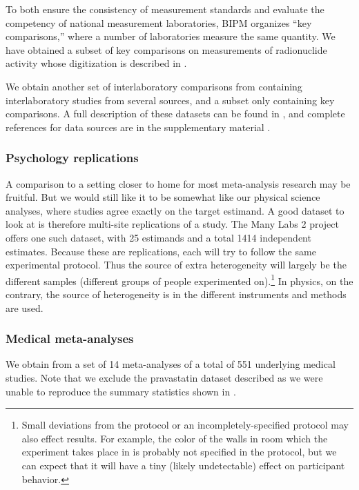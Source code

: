 \documentclass[letterpaper,12pt]{article}
\begin{document}
To both ensure the consistency of measurement standards and evaluate the competency of national measurement laboratories, BIPM organizes ``key comparisons,'' where a number of laboratories measure the same quantity. We have obtained a subset of key comparisons on measurements of radionuclide activity whose digitization is described in \cite{coulon2021digitalization}.

We obtain another set of interlaboratory comparisons from \citet{bailey2017not} containing interlaboratory studies from several sources, and a subset only containing key comparisons. A full description of these datasets can be found in \citet[sec.~2.1-2.3, 3.4]{bailey2017not}, and complete references for data sources are in the supplementary material \citep{bailey2016data}.

\subsubsection{Psychology replications}

A comparison to a setting closer to home for most meta-analysis research may be fruitful. But we would still like it to be somewhat like our physical science analyses, where studies agree exactly on the target estimand. A good dataset to look at is therefore multi-site replications of a study. The Many Labs 2 project \citep{klein2018many} offers one such dataset, with 25 estimands and a total 1414 independent estimates. Because these are replications, each will try to follow the same experimental protocol. Thus the source of extra heterogeneity will largely be the different samples (different groups of people experimented on).\footnote{Small deviations from the protocol or an incompletely-specified protocol may also effect results. For example, the color of the walls in room which the experiment takes place in is probably not specified in the protocol, but we can expect that it will have a tiny (likely undetectable) effect on participant behavior.} In physics, on the contrary, the source of heterogeneity is in the different instruments and methods are used.


\subsubsection{Medical meta-analyses}

We obtain from \citet{baker2013meta} a set of 14 meta-analyses of a total of 551 underlying medical studies. Note that we exclude the pravastatin dataset described as we were unable to reproduce the summary statistics shown in \citet{baker2013meta}.
\end{document}
